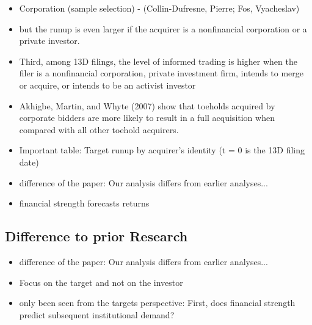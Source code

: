 \documentclass[12pt]{article}
\begin{document}
    \begin{itemize}

        \item Corporation (sample selection) - (Collin-Dufresne, Pierre; Fos, Vyacheslav)

        \item but the runup is even larger if the acquirer is a nonfinancial corporation or a private investor.\citep{Brigida2012}

        \item Third, among 13D filings, the level of informed trading is higher when the filer is a nonfinancial corporation, private investment firm, intends to merge or acquire, or intends to be an activist investor \citep{Brigida2012}

        \item Akhigbe, Martin, and Whyte (2007) show that toeholds acquired by corporate bidders are more likely to result in a full acquisition when compared with all other toehold acquirers.\citep{Brigida2012}

        \item Important table: Target runup by acquirer's identity (t = 0 is the 13D filing date) \citep{Brigida2012}

        \item difference of the paper: Our analysis differs from earlier analyses...\citep{Brigida2012}

        \item financial strength forecasts returns \citep{Choi2012}

    \end{itemize}

\subsection{Difference to prior Research}

    \begin{itemize}

        \item difference of the paper: Our analysis differs from earlier analyses...\citep{Brigida2012}

        \item Focus on the target and not on the investor 

        \item only been seen from the targets perspective: First, does financial strength predict subsequent institutional demand? \citep{Choi2012}

    \end{itemize}
\end{document}
